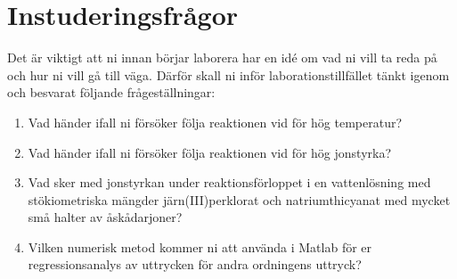 \section{Instuderingsfrågor}
\label{sec:instudering}
Det är viktigt att ni innan börjar laborera har en idé om vad ni vill ta
reda på och hur ni vill gå till väga. Därför skall ni inför
laborationstillfället tänkt igenom och besvarat följande
frågeställningar:

\begin{enumerate}
\item Vad händer ifall ni försöker följa reaktionen vid för hög
  temperatur?
\item Vad händer ifall ni försöker följa reaktionen vid för hög
  jonstyrka?
\item Vad sker med jonstyrkan under reaktionsförloppet i en vattenlösning
  med stökiometriska mängder järn(III)perklorat och natriumthicyanat med
  mycket små halter av åskådarjoner?
\item Vilken numerisk metod kommer ni att använda i Matlab för er
  regressionsanalys av uttrycken för andra ordningens uttryck?
\end{enumerate}

